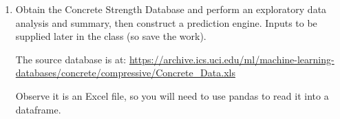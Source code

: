 \documentclass[12pt]{article}
\begin{document}
\begin{enumerate}
Summarize your efforts into a brief blog-post type of report (i.e. in a Jupyter Notebook)

\clearpage
 
 
%
 
\item Obtain the Concrete Strength Database and perform an exploratory data analysis and summary, then construct a prediction engine.  Inputs to be supplied later in the class (so save the work).  

The source database is at:  \url{https://archive.ics.uci.edu/ml/machine-learning-databases/concrete/compressive/Concrete_Data.xls} 

Observe it is an Excel file, so you will need to use pandas to read it into a dataframe.


\end{enumerate}
\end{document}
